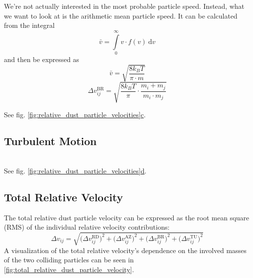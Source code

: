         We're not actually interested in the most probable particle speed.
        Instead, what we want to look at is the arithmetic mean particle speed.
        It can be calculated from the integral 
        \begin{equation}
            \bar{v}
            =\int\limits_0^\infty v\cdot f(v)\ \text{d}v
        \end{equation}
        and then be expressed as
        \begin{equation}
            \bar{v}
            =\sqrt{\frac{8k_BT}{\pi\cdot m}}
        \end{equation}
        \begin{equation}
            \Delta v_{ij}^\text{BR}
            =\sqrt{\frac{8k_BT}{\pi}\cdot\frac{m_i+m_j}{m_i\cdot m_j}}
        \end{equation}

        See fig. 
        \hyperref[fig:relative_dust_particle_velocities]{\ref*{fig:relative_dust_particle_velocities}c}.

    \subsection{Turbulent Motion}

         \\
    
        See fig.
        \hyperref[fig:relative_dust_particle_velocities]{\ref*{fig:relative_dust_particle_velocities}d}.

    \newpage\subsection{Total Relative Velocity}

        The total relative dust particle velocity can be expressed as the root mean square (RMS) of 
        the individual relative velocity contributions:
        \begin{equation}
            \Delta v_{ij}
                = \sqrt{
                    \big(\Delta v^\text{RD}_{ij}\big)^2
                    + \big(\Delta v^\text{AZ}_{ij}\big)^2
                    + \big(\Delta v^\text{BR}_{ij}\big)^2
                    + \big(\Delta v^\text{TU}_{ij}\big)^2
                }
        \end{equation}
        A visualization of the total relative velocity's dependence on the involved masses of the
        two colliding particles can be seen in \cref{fig:total_relative_dust_particle_velocity}.

